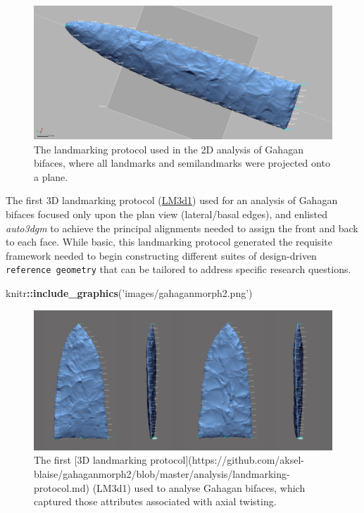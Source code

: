 \documentclass[
]{article}
\newenvironment{Shaded}{\begin{snugshade}}{\end{snugshade}}
\newcommand{\KeywordTok}[1]{\textcolor[rgb]{0.13,0.29,0.53}{\textbf{#1}}}
\newcommand{\NormalTok}[1]{#1}
\newcommand{\OperatorTok}[1]{\textcolor[rgb]{0.81,0.36,0.00}{\textbf{#1}}}
\newcommand{\StringTok}[1]{\textcolor[rgb]{0.31,0.60,0.02}{#1}}
\begin{document}
\begin{figure}
\includegraphics[width=47.76in]{images/gahaganmorph} \caption{The landmarking protocol used in the 2D analysis of Gahagan bifaces, where all landmarks and semilandmarks were projected onto a plane.}\label{fig:fig.gahaganmorph}
\end{figure}

The first 3D landmarking protocol
(\href{https://github.com/aksel-blaise/gahaganmorph2/blob/master/analysis/landmarking-protocol.md}{LM3d1})
used for an analysis of Gahagan bifaces focused only upon the plan view
(lateral/basal edges), and enlisted \emph{auto3dgm} to achieve the
principal alignments needed to assign the front and back to each face.
While basic, this landmarking protocol generated the requisite framework
needed to begin constructing different suites of design-driven
\texttt{reference\ geometry} that can be tailored to address specific
research questions.

\begin{Shaded}
\begin{Highlighting}[]
\NormalTok{knitr}\OperatorTok{::}\KeywordTok{include_graphics}\NormalTok{(}\StringTok{'images/gahaganmorph2.png'}\NormalTok{)}
\end{Highlighting}
\end{Shaded}

\begin{figure}
\includegraphics[width=53.12in]{images/gahaganmorph2} \caption{The first [3D landmarking protocol](https://github.com/aksel-blaise/gahaganmorph2/blob/master/analysis/landmarking-protocol.md) (LM3d1) used to analyse Gahagan bifaces, which captured those attributes associated with axial twisting.}\label{fig:fig.gahaganmorph2}
\end{figure}
\end{document}
